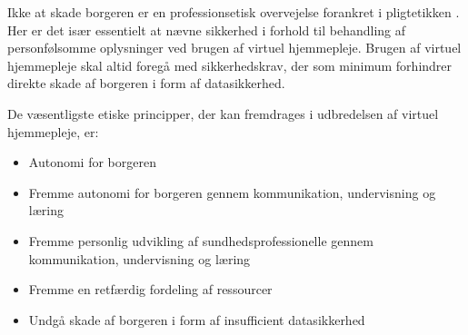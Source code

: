 Ikke at skade borgeren er en professionsetisk overvejelse forankret i pligtetikken \cite{mtv}. Her er det især essentielt at nævne sikkerhed i forhold til behandling af personfølsomme oplysninger ved brugen af virtuel hjemmepleje. Brugen af virtuel hjemmepleje skal altid foregå med sikkerhedskrav, der som minimum forhindrer direkte skade af borgeren i form af datasikkerhed.

De væsentligste etiske principper, der kan fremdrages i udbredelsen af virtuel hjemmepleje, er:

\begin{itemize}
	\item Autonomi for borgeren
	\item Fremme autonomi for borgeren gennem kommunikation, undervisning og læring
	\item Fremme personlig udvikling af sundhedsprofessionelle gennem kommunikation, undervisning og læring
	\item Fremme en retfærdig fordeling af ressourcer 
	\item Undgå skade af borgeren i form af insufficient datasikkerhed
\end{itemize}





